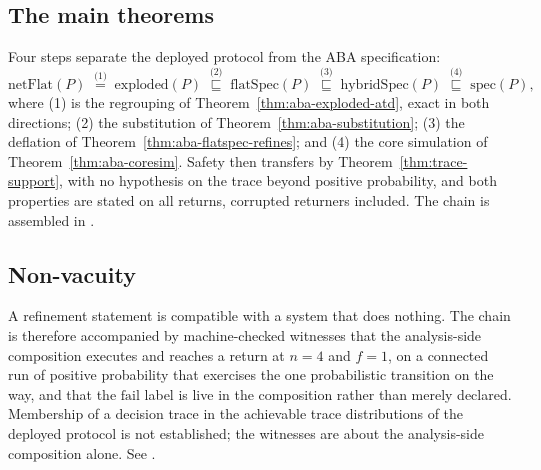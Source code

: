 
\subsection{The main theorems}

Four steps separate the deployed protocol from the ABA specification:
\[
  \mathrm{netFlat}(P)
  \;\overset{\text{(1)}}{=}\; \mathrm{exploded}(P)
  \;\overset{\text{(2)}}{\sqsubseteq}\; \mathrm{flatSpec}(P)
  \;\overset{\text{(3)}}{\sqsubseteq}\; \mathrm{hybridSpec}(P)
  \;\overset{\text{(4)}}{\sqsubseteq}\; \mathrm{spec}(P),
\]
where (1) is the regrouping of Theorem~\ref{thm:aba-exploded-atd}, exact in both directions; (2) the substitution of Theorem~\ref{thm:aba-substitution}; (3) the deflation of Theorem~\ref{thm:aba-flatspec-refines}; and (4) the core simulation of Theorem~\ref{thm:aba-coresim}.
Safety then transfers by Theorem~\ref{thm:trace-support}, with no hypothesis on the trace beyond positive probability, and both properties are stated on all returns, corrupted returners included.
The chain is assembled in .




\subsection{Non-vacuity}

A refinement statement is compatible with a system that does nothing.
The chain is therefore accompanied by machine-checked witnesses that the analysis-side composition executes and reaches a return at $n = 4$ and $f = 1$, on a connected run of positive probability that exercises the one probabilistic transition on the way, and that the $\mathrm{fail}$ label is live in the composition rather than merely declared.
Membership of a decision trace in the achievable trace distributions of the deployed protocol is not established; the witnesses are about the analysis-side composition alone.
See .




